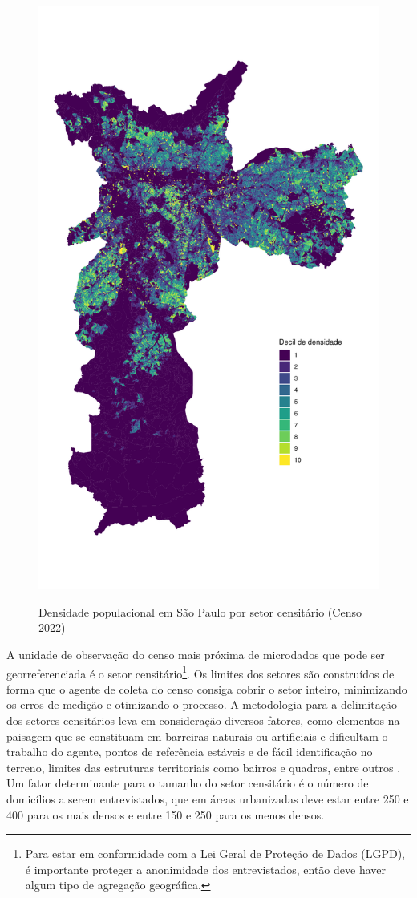 \begin{figure}[!h]
    \centering
    \caption{Densidade populacional em São Paulo por setor censitário (Censo 2022)}
    \includegraphics[width = .95\linewidth]{figuras/mapa-densidade.pdf}
    \label{fig:populacao}
\end{figure}

A unidade de observação do censo mais próxima de microdados que pode ser georreferenciada é o setor censitário\footnote{Para estar em conformidade com a Lei Geral de Proteção de Dados (LGPD), é importante proteger a anonimidade dos entrevistados, então deve haver algum tipo de agregação geográfica.}. Os limites dos setores são construídos de forma que o agente de coleta do censo consiga cobrir o setor inteiro, minimizando os erros de medição e otimizando o processo. A metodologia para a delimitação dos setores censitários leva em consideração diversos fatores, como elementos na paisagem que se constituam em barreiras naturais ou artificiais e dificultam o trabalho do agente, pontos de referência estáveis e de fácil identificação no terreno, limites das estruturas territoriais como bairros e quadras, entre outros \cite{IBGE2024}. Um fator determinante para o tamanho do setor censitário é o número de domicílios a serem entrevistados, que em áreas urbanizadas deve estar entre 250 e 400 para os mais densos e entre 150 e 250 para os menos densos.

